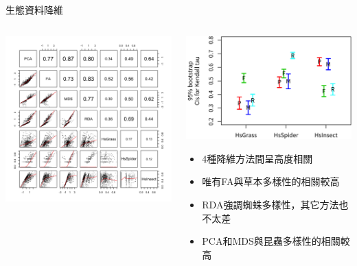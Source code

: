 \documentclass[10pt, aspectratio=1610, xcolor=table]{beamer}
\begin{document}
\begin{frame}[fragile]{生態資料降維}
\begin{columns}[onlytextwidth, c]
	\begin{column}{0.5\textwidth}
		\includegraphics[trim=100 100 100 100, width=1\textwidth]{原始資料降維分數.png}
	\end{column}
	\begin{column}{0.45\textwidth}
		\includegraphics[width=1\textwidth]{bootR-final.png}
		\begin{itemize}
			\item 4種降維方法間呈高度相關
			\item 唯有FA與草本多樣性的相關較高
			\item RDA強調蜘蛛多樣性，其它方法也不太差
			\item PCA和MDS與昆蟲多樣性的相關較高
		\end{itemize}
	\end{column}
\end{columns}
\end{frame}
\end{document}
